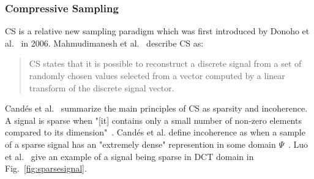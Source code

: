

\subsubsection{Compressive Sampling}
\label{sec:Compressive Sampling}

\ac{CS} is a relative new sampling paradigm which was first
introduced by Donoho et al.~\cite{Donoho06compressedsensing} in 2006. 
Mahmudimanesh et al.~\cite{mahmudimanesh2010reordering} describe \ac{CS} as:

\begin{quotation}
    \ac{CS} states that it is possible to reconstruct a discrete signal from a set of
    randomly chosen values selected from a vector computed by a linear transform
    of the discrete signal vector.
\end{quotation}

Candés et al.~\cite{candes2008introduction} summarize the main principles of
\ac{CS} as sparsity and incoherence. A signal is sparse when "[it] contains
only a small number of non-zero elements compared to its
dimension"~\cite{elzanati2015collaborative}. Candés et al. define incoherence
as when a sample of a sparse signal has an "extremely dense" represention in
some domain $ \Psi $~\cite{candes2008introduction}. Luo et
al.~\cite{luo2009compressive} give an example of a signal being sparse in
\ac{DCT} domain in Fig.~\ref{fig:sparsesignal}.

